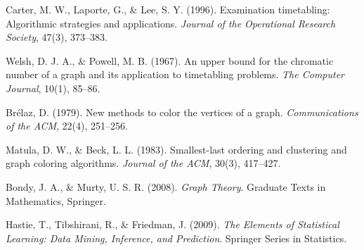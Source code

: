 \documentclass[11pt,a4paper]{article}
\begin{document}
\begin{enumerate}[label={[\arabic*]}]
    \item Carter, M. W., Laporte, G., \& Lee, S. Y. (1996). Examination timetabling: Algorithmic strategies and applications. \textit{Journal of the Operational Research Society}, 47(3), 373--383.
    \item Welsh, D. J. A., \& Powell, M. B. (1967). An upper bound for the chromatic number of a graph and its application to timetabling problems. \textit{The Computer Journal}, 10(1), 85--86.
    \item Brélaz, D. (1979). New methods to color the vertices of a graph. \textit{Communications of the ACM}, 22(4), 251--256.
    \item Matula, D. W., \& Beck, L. L. (1983). Smallest-last ordering and clustering and graph coloring algorithms. \textit{Journal of the ACM}, 30(3), 417--427.
    \item Bondy, J. A., \& Murty, U. S. R. (2008). \textit{Graph Theory}. Graduate Texts in Mathematics, Springer.
    \item Hastie, T., Tibshirani, R., \& Friedman, J. (2009). \textit{The Elements of Statistical Learning: Data Mining, Inference, and Prediction}. Springer Series in Statistics.
\end{enumerate}
\end{document}
